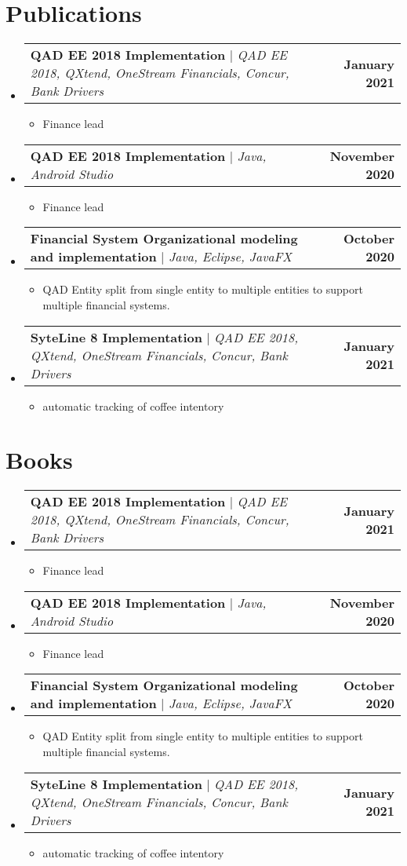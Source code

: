 \documentclass[letterpaper,11pt]{article}
\makeatletter
\newcommand{\resumeItem}[1]{
  \item\small{
    {#1 \vspace{-2pt}}
  }
}
\newcommand{\resumeProjectHeading}[2]{
    \item
    \begin{tabular*}{1.001\textwidth}{l@{\extracolsep{\fill}}r}
      \small#1 & \textbf{\small #2}\\
    \end{tabular*}\vspace{-7pt}
}
\newcommand{\resumeSubHeadingListStart}{\begin{itemize}[leftmargin=0.0in, label={}]}
\newcommand{\resumeSubHeadingListEnd}{\end{itemize}}
\newcommand{\resumeItemListStart}{\begin{itemize}}
\newcommand{\resumeItemListEnd}{\end{itemize}\vspace{-5pt}}
\makeatother
\begin{document}
\section{Publications}
    \vspace{-5pt}
    \resumeSubHeadingListStart
      \resumeProjectHeading
          {\textbf{QAD EE 2018 Implementation} $|$ \emph{QAD EE 2018, QXtend, OneStream Financials, Concur, Bank Drivers}}{January 2021}
          \resumeItemListStart
            \resumeItem{Finance lead }
          \resumeItemListEnd
          \vspace{-13pt}
      \resumeProjectHeading
          {\textbf{QAD EE 2018 Implementation} $|$ \emph{Java, Android Studio}}{November 2020}
          \resumeItemListStart
            \resumeItem{Finance lead}
          \resumeItemListEnd 
          \vspace{-13pt}
      \resumeProjectHeading
          {\textbf{Financial System Organizational modeling and implementation} $|$ \emph{Java, Eclipse, JavaFX}}{October 2020}
          \resumeItemListStart
            \resumeItem{QAD Entity split from single entity to multiple entities to support multiple financial systems.}
          \resumeItemListEnd 
      \resumeProjectHeading
          {\textbf{SyteLine 8 Implementation} $|$ \emph{QAD EE 2018, QXtend, OneStream Financials, Concur, Bank Drivers}}{January 2021}
          \resumeItemListStart
            \resumeItem{automatic tracking of coffee intentory }
          \resumeItemListEnd
          \vspace{-13pt}
    \resumeSubHeadingListEnd
\vspace{+16pt}

\section{Books}
    \vspace{-5pt}
    \resumeSubHeadingListStart
      \resumeProjectHeading
          {\textbf{QAD EE 2018 Implementation} $|$ \emph{QAD EE 2018, QXtend, OneStream Financials, Concur, Bank Drivers}}{January 2021}
          \resumeItemListStart
            \resumeItem{Finance lead }
          \resumeItemListEnd
          \vspace{-13pt}
      \resumeProjectHeading
          {\textbf{QAD EE 2018 Implementation} $|$ \emph{Java, Android Studio}}{November 2020}
          \resumeItemListStart
            \resumeItem{Finance lead}
          \resumeItemListEnd 
          \vspace{-13pt}
      \resumeProjectHeading
          {\textbf{Financial System Organizational modeling and implementation} $|$ \emph{Java, Eclipse, JavaFX}}{October 2020}
          \resumeItemListStart
            \resumeItem{QAD Entity split from single entity to multiple entities to support multiple financial systems.}
          \resumeItemListEnd 
      \resumeProjectHeading
          {\textbf{SyteLine 8 Implementation} $|$ \emph{QAD EE 2018, QXtend, OneStream Financials, Concur, Bank Drivers}}{January 2021}
          \resumeItemListStart
            \resumeItem{automatic tracking of coffee intentory }
          \resumeItemListEnd
          \vspace{-13pt}
    \resumeSubHeadingListEnd
\vspace{+16pt}
\end{document}
